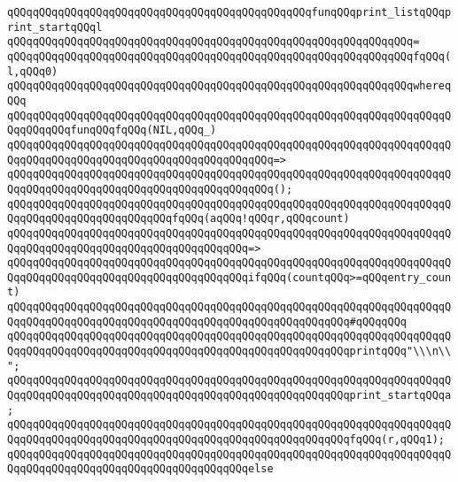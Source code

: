 \verb|qQQqqQQqqQQqqQQqqQQqqQQqqQQqqQQqqQQqqQQqqQQqqQQqfunqQQqprint_listqQQqprint_startqQQql|\newline
\verb|qQQqqQQqqQQqqQQqqQQqqQQqqQQqqQQqqQQqqQQqqQQqqQQqqQQqqQQqqQQqqQQq=|\newline
\verb|qQQqqQQqqQQqqQQqqQQqqQQqqQQqqQQqqQQqqQQqqQQqqQQqqQQqqQQqqQQqqQQqfqQQq(l,qQQq0)|\newline
\verb|qQQqqQQqqQQqqQQqqQQqqQQqqQQqqQQqqQQqqQQqqQQqqQQqqQQqqQQqqQQqqQQqwhereqQQq|\newline
\verb|qQQqqQQqqQQqqQQqqQQqqQQqqQQqqQQqqQQqqQQqqQQqqQQqqQQqqQQqqQQqqQQqqQQqqQQqqQQqqQQqfunqQQqfqQQq(NIL,qQQq_)|\newline
\verb|qQQqqQQqqQQqqQQqqQQqqQQqqQQqqQQqqQQqqQQqqQQqqQQqqQQqqQQqqQQqqQQqqQQqqQQqqQQqqQQqqQQqqQQqqQQqqQQqqQQqqQQqqQQqqQQq=>|\newline
\verb|qQQqqQQqqQQqqQQqqQQqqQQqqQQqqQQqqQQqqQQqqQQqqQQqqQQqqQQqqQQqqQQqqQQqqQQqqQQqqQQqqQQqqQQqqQQqqQQqqQQqqQQqqQQqqQQq();|\newline
\newline
\verb|qQQqqQQqqQQqqQQqqQQqqQQqqQQqqQQqqQQqqQQqqQQqqQQqqQQqqQQqqQQqqQQqqQQqqQQqqQQqqQQqqQQqqQQqqQQqqQQqfqQQq(aqQQq!qQQqr,qQQqcount)|\newline
\verb|qQQqqQQqqQQqqQQqqQQqqQQqqQQqqQQqqQQqqQQqqQQqqQQqqQQqqQQqqQQqqQQqqQQqqQQqqQQqqQQqqQQqqQQqqQQqqQQqqQQqqQQqqQQq=>|\newline
\verb|qQQqqQQqqQQqqQQqqQQqqQQqqQQqqQQqqQQqqQQqqQQqqQQqqQQqqQQqqQQqqQQqqQQqqQQqqQQqqQQqqQQqqQQqqQQqqQQqqQQqqQQqqQQqifqQQq(countqQQq>=qQQqentry_count)|\newline
\verb|qQQqqQQqqQQqqQQqqQQqqQQqqQQqqQQqqQQqqQQqqQQqqQQqqQQqqQQqqQQqqQQqqQQqqQQqqQQqqQQqqQQqqQQqqQQqqQQqqQQqqQQqqQQqqQQqqQQqqQQqqQQq#qQQqqQQq|\newline
\verb|qQQqqQQqqQQqqQQqqQQqqQQqqQQqqQQqqQQqqQQqqQQqqQQqqQQqqQQqqQQqqQQqqQQqqQQqqQQqqQQqqQQqqQQqqQQqqQQqqQQqqQQqqQQqqQQqqQQqqQQqqQQqprintqQQq"\\\n\\";|\newline
\verb|qQQqqQQqqQQqqQQqqQQqqQQqqQQqqQQqqQQqqQQqqQQqqQQqqQQqqQQqqQQqqQQqqQQqqQQqqQQqqQQqqQQqqQQqqQQqqQQqqQQqqQQqqQQqqQQqqQQqqQQqqQQqprint_startqQQqa;|\newline
\verb|qQQqqQQqqQQqqQQqqQQqqQQqqQQqqQQqqQQqqQQqqQQqqQQqqQQqqQQqqQQqqQQqqQQqqQQqqQQqqQQqqQQqqQQqqQQqqQQqqQQqqQQqqQQqqQQqqQQqqQQqqQQqfqQQq(r,qQQq1);|\newline
\verb|qQQqqQQqqQQqqQQqqQQqqQQqqQQqqQQqqQQqqQQqqQQqqQQqqQQqqQQqqQQqqQQqqQQqqQQqqQQqqQQqqQQqqQQqqQQqqQQqqQQqqQQqqQQqelse|\newline
